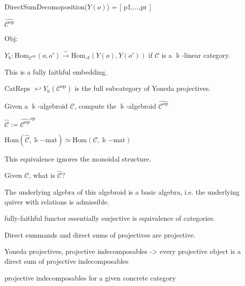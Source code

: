 DirectSumDecomoposition($Y(o)$) = [ p1,...,pr ]

$\widehat{\mathcal{C}^{\mathrm{op}}}$

$\mathrm{Obj}$: 

$Y_{\Bbbk} : \mathrm{Hom}_{\mathcal{C}^{\mathrm{op}}}(o,o') \xrightarrow{\sim} \mathrm{Hom}_\mathcal{A} (Y(o),Y(o'))$ if $\mathcal{C}$ is a $\Bbbk$-linear category.

This is a fully faithful embedding.

CatReps $\hookleftarrow Y_{\Bbbk}(\mathcal{C}^{\mathrm{op}})$ is the full subcategory of Yoneda projectives.

Given a $\Bbbk$-algebroid $\mathcal{C}$, compute the $\Bbbk$-algebroid $\widehat{\mathcal{C}^{\mathrm{op}}}$ 

$\widehat{\mathcal{C}} := \widehat{\mathcal{C}^{\mathrm{op}}}^{\mathrm{op}}$

$\mathrm{Hom}(\widehat{\mathcal{C}},\Bbbk\mathrm{-mat}) \simeq \mathrm{Hom}(\mathcal{C},\Bbbk\mathrm{-mat})$

This equivalence ignores the monoidal structure.

Given $\mathcal{C}$, what is $\widehat{\mathcal{C}}$?

The underlying algebra of this algebroid is a basic algebra, i.e. the underlying quiver with relations is admissible.

fully-faithful functor essentially surjective is equivalence of categories.


Direct summands and direct sums of projectives are projective.

Yoneda projectives, projective indecomposables -> every projective object is a direct sum of projective indecomposables

projective indecomposables for a given concrete category
